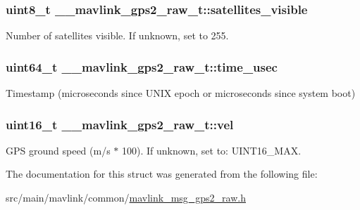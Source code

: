 \hypertarget{struct____mavlink__gps2__raw__t_a162bb84f09a8ee280da65b979bc87742}{
\subsubsection[{satellites\+\_\+visible}]{\setlength{\rightskip}{0pt plus 5cm}uint8\+\_\+t \+\_\+\+\_\+mavlink\+\_\+gps2\+\_\+raw\+\_\+t\+::satellites\+\_\+visible}}\label{struct____mavlink__gps2__raw__t_a162bb84f09a8ee280da65b979bc87742}


Number of satellites visible. If unknown, set to 255. 

\hypertarget{struct____mavlink__gps2__raw__t_a355d2b8ac770c7c8954f67f0890d4182}{
\subsubsection[{time\+\_\+usec}]{\setlength{\rightskip}{0pt plus 5cm}uint64\+\_\+t \+\_\+\+\_\+mavlink\+\_\+gps2\+\_\+raw\+\_\+t\+::time\+\_\+usec}}\label{struct____mavlink__gps2__raw__t_a355d2b8ac770c7c8954f67f0890d4182}


Timestamp (microseconds since U\+N\+I\+X epoch or microseconds since system boot) 

\hypertarget{struct____mavlink__gps2__raw__t_a9e5043757c692dbb795727869976ab17}{
\subsubsection[{vel}]{\setlength{\rightskip}{0pt plus 5cm}uint16\+\_\+t \+\_\+\+\_\+mavlink\+\_\+gps2\+\_\+raw\+\_\+t\+::vel}}\label{struct____mavlink__gps2__raw__t_a9e5043757c692dbb795727869976ab17}


G\+P\+S ground speed (m/s $\ast$ 100). If unknown, set to\+: U\+I\+N\+T16\+\_\+\+M\+A\+X. 



The documentation for this struct was generated from the following file\+:\begin{DoxyCompactItemize}
\item 
src/main/mavlink/common/\hyperlink{mavlink__msg__gps2__raw_8h}{mavlink\+\_\+msg\+\_\+gps2\+\_\+raw.\+h}\end{DoxyCompactItemize}
